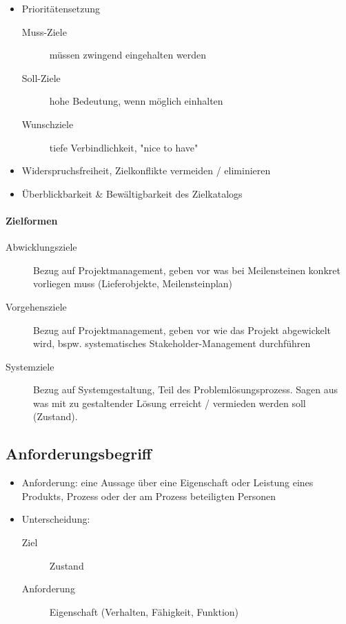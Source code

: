 \documentclass[a4paper]{article}
\begin{document}
\begin{itemize}
\begin{itemize}
							\item Prioritätensetzung
								\begin{description}
									\item[Muss-Ziele] müssen zwingend eingehalten werden
									\item[Soll-Ziele] hohe Bedeutung, wenn möglich einhalten
									\item[Wunschziele] tiefe Verbindlichkeit, "nice to have"
								\end{description}
							\item Widerspruchsfreiheit, Zielkonflikte vermeiden / eliminieren
							\item Überblickbarkeit \& Bewältigbarkeit des Zielkatalogs
						\end{itemize}
				\end{itemize}
			
			\paragraph{Zielformen}
			
			\begin{description}
				\item[Abwicklungsziele] Bezug auf Projektmanagement, geben vor was bei Meilensteinen konkret vorliegen muss (Lieferobjekte, Meilensteinplan)
				\item[Vorgehensziele] Bezug auf Projektmanagement, geben vor wie das Projekt abgewickelt wird, bspw. systematisches Stakeholder-Management durchführen
				\item[Systemziele] Bezug auf Systemgestaltung, Teil des Problemlösungsprozess.
				Sagen aus was mit zu gestaltender Lösung erreicht / vermieden werden soll (Zustand).
			\end{description}
	
		\subsection{Anforderungsbegriff}
		
			\begin{itemize}
				\item Anforderung: eine Aussage über eine Eigenschaft oder Leistung eines Produkts, Prozess oder der am Prozess beteiligten Personen
				\item Unterscheidung:
					\begin{description}
						\item[Ziel] Zustand
						\item[Anforderung] Eigenschaft (Verhalten, Fähigkeit, Funktion)
					\end{description}
			\end{itemize}
		
\end{document}
